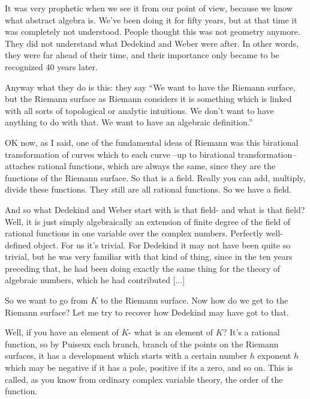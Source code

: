 \documentclass{article}
\begin{document}
It was very prophetic 
when we see it from our point of view,
because we know what abstract algebra is.
We've been doing it for fifty years,
but at that time it was completely not understood.
People thought this was not geometry anymore.
They did not understand what Dedekind and Weber were after.
In other words, they were far ahead of their time,
and their importance only became to be recognized 40 years later.

Anyway what they do is this:
they say ``We want to have the Riemann surface,
but the Riemann surface as Riemann considers it 
is something which is linked 
with all sorts of topological or analytic intuitions.
We don't want to have anything to do with that.
We want to have an algebraic definition.''

OK now, as I said, 
one of the fundamental ideas of Riemann
was this birational transformation of curves
which to each curve 
--up to birational transformation-- 
attaches rational functions,
which are always the same, 
since they are the functions of the Riemann surface.
So that is a field.
Really you can add, multiply, divide these functions. 
They still are all rational functions.
So we have a field.

And so what Dedekind and Weber start with 
is that field- and what is that field? 
Well, it is just simply algebraically 
an extension of finite degree 
of the field of rational functions 
in one variable over the complex numbers.
Perfectly well-defined object.
For us it's trivial.
For Dedekind it may not have been quite so trivial,
but he was very familiar with that kind of thing,
since in the ten years preceding that,
he had been doing exactly the same thing 
for the theory of algebraic numbers,
which he had contributed [...]

So we want to go from $K$ to the Riemann surface.
Now how do we get to the Riemann surface?
Let me try to recover how Dedekind may have got to that.

Well, if you have an element of $K$-
what is an element of $K$?
It's a rational function, 
so by Puiseux each branch, branch of the points on the Riemann surfaces,
it has a development which starts 
with a certain number $h$ exponent $h$ 
which may be negative if it has a pole,
positive if its a zero, and so on.
This is called, as you know from ordinary complex variable theory, 
the order of the function.
\end{document}

